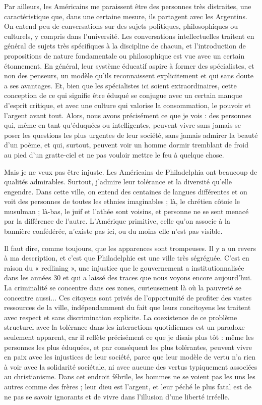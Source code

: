 \documentclass[a4paper, 12pt]{article}
\begin{document}
Par ailleurs, les Américains me paraissent être des personnes très distraites,
une caractéristique que, dans une certaine mesure, ils partagent avec les
Argentins. On entend peu de conversations sur des sujets politiques,
philosophiques ou culturels, y compris dans l'université. Les conversations
intellectuelles traitent en général de sujets très spécifiques à la discipline
de chacun, et l'introduction de propositions de nature fondamentale ou
philosophique est vue avec un certain étonnement. En général, leur système
éducatif aspire à former des spécialistes, et non des penseurs, un modèle qu'ils
reconnaissent explicitement et qui sans doute a ses avantages. Et, bien que les
spécialistes ici soient extraordinaires, cette conception de ce qui signifie
être éduqué se conjugue avec un certain manque d'esprit critique, et avec une
culture qui valorise la consommation, le pouvoir et l'argent avant tout. Alors,
nous avons précisément ce que je vois : des personnes qui, même en tant
qu'éduquées ou intelligentes, peuvent vivre sans jamais se poser les questions
les plus urgentes de leur société, sans jamais admirer la beauté d'un poème, et
qui, surtout, peuvent voir un homme dormir tremblant de froid au pied d'un
gratte-ciel et ne pas vouloir mettre le feu à quelque chose.

Mais je ne veux pas être injuste. Les Américains de Philadelphia ont beaucoup de
qualités admirables. Surtout, j'admire leur tolérance et la diversité qu'elle
engendre. Dans cette ville, on entend des centaines de langues différentes et on
voit des personnes de toutes les ethnies imaginables ; là, le chrétien côtoie le
musulman ; là-bas, le juif et l'athée sont voisins, et personne ne se sent
menacé par la différence de l'autre. L'Amérique primitive, celle qu'on associe à
la bannière confédérée, n'existe pas ici, ou du moins elle n'est pas visible.

Il faut dire, comme toujours, que les apparences sont trompeuses. Il y a un
revers à ma description, et c'est que Philadelphie est une ville très ségréguée.
C'est en raison du « redlining », une injustice que le gouvernement a
institutionnalisée dans les années 30 et qui a laissé des traces que nous voyons
encore aujourd'hui. La criminalité se concentre dans ces zones, curieusement là
où la pauvreté se concentre aussi... Ces citoyens sont privés de l'opportunité
de profiter des vastes ressources de la ville, indépendamment du fait que leurs
concitoyens les traitent avec respect et sans discrimination explicite. La
coexistence de ce problème structurel avec la tolérance dans les interactions
quotidiennes est un paradoxe seulement apparent, car il reflète précisément ce
que je disais plus tôt : même les personnes les plus éduquées, et par conséquent
les plus tolérantes, peuvent vivre en paix avec les injustices de leur société,
parce que leur modèle de vertu n'a rien à voir avec la solidarité sociétale, ni
avec aucune des vertus typiquement associées au christianisme. Dans cet endroit
fébrile, les hommes ne se voient pas les uns les autres comme des frères ; leur
dieu est l'argent, et leur péché le plus fatal est de ne pas se savoir ignorants
et de vivre dans l'illusion d'une liberté irréelle.
\end{document}
